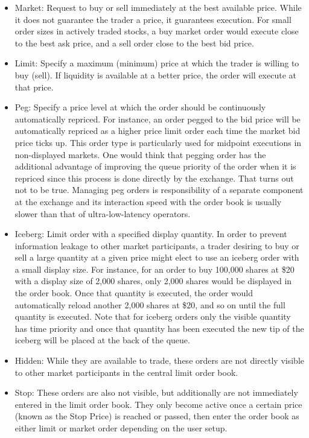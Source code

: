 \begin{itemize}
\item  Market: Request to buy or sell immediately at the best available price. While it does not guarantee the trader a price, it guarantees execution. For small order sizes in actively traded stocks, a buy market order would execute close to the best ask price, and a sell order close to the best bid price.

\item  Limit: Specify a maximum (minimum) price at which the trader is willing to buy (sell). If liquidity is available at a better price, the order will execute at that price.

\item  Peg: Specify a price level at which the order should be continuously automatically repriced. For instance, an order pegged to the bid price will be automatically repriced as a higher price limit order each time the market bid price ticks up. This order type is particularly used for midpoint executions in non-displayed markets. One would think that pegging order has the additional advantage of improving the queue priority of the order when it is repriced since this process is done directly by the exchange. That turns out not to be true. Managing peg orders is responsibility of a separate component at the exchange and its interaction speed with the order book is usually slower than that of ultra-low-latency operators.

\item  Iceberg: Limit order with a specified display quantity. In order to prevent information leakage to other market participants, a trader desiring to buy or sell a large quantity at a given price might elect to use an iceberg order with a small display size. For instance, for an order to buy 100,000 shares at \$20 with a display size of 2,000 shares, only 2,000 shares would be displayed in the order book. Once that quantity is executed, the order would automatically reload another 2,000 shares at \$20, and so on until the full quantity is executed. Note that for iceberg orders only the visible quantity has time priority and once that quantity has been executed the new tip of the iceberg will be placed at the back of the queue.

\item  Hidden: While they are available to trade, these orders are not directly visible to other market participants in the central limit order book. 

\item  Stop: These orders are also not visible, but additionally are not immediately entered in the limit order book. They only become active once a certain price (known as the Stop Price) is reached or passed, then enter the order book as either limit or market order depending on the user setup.


\end{itemize}
